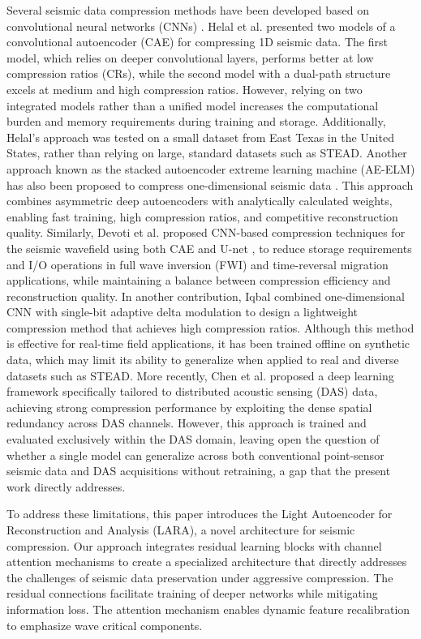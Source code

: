 \documentclass[fleqn,10pt]{wlscirep}
\begin{document}
Several seismic data compression methods have been developed based on convolutional neural networks (CNNs) \cite{lecun1989backpropagation,helal2021seismic,nuha2020deep,devoti2019wavefield,iqbal20221}. Helal et al. \cite{helal2021seismic} presented two models of a convolutional autoencoder (CAE) for compressing 1D seismic data. The first model, which relies on deeper convolutional layers, performs better at low compression ratios (CRs), while the second model with a dual-path structure excels at medium and high compression ratios. However, relying on two integrated models rather than a unified model increases the computational burden and memory requirements during training and storage. Additionally, Helal's approach was tested on a small dataset from East Texas in the United States, rather than relying on large, standard datasets such as STEAD. Another approach known as the stacked autoencoder extreme learning machine (AE-ELM) has also been proposed to compress one-dimensional seismic data \cite{nuha2020deep}. This approach combines asymmetric deep autoencoders with analytically calculated weights, enabling fast training, high compression ratios, and competitive reconstruction quality. Similarly, Devoti et al. \cite{devoti2019wavefield} proposed CNN-based compression techniques for the seismic wavefield using both CAE and U-net \cite{ronneberger2015u}, to reduce storage requirements and I/O operations in full wave inversion (FWI) and time-reversal migration applications, while maintaining a balance between compression efficiency and reconstruction quality. In another contribution, Iqbal \cite{iqbal20221} combined one-dimensional CNN with single-bit adaptive delta modulation to design a lightweight compression method that achieves high compression ratios. Although this method is effective for real-time field applications, it has been trained offline on synthetic data, which may limit its ability to generalize when applied to real and diverse datasets such as STEAD.  More recently, Chen et al. \cite{chen2025dascompression} proposed a deep learning framework specifically tailored to distributed acoustic sensing (DAS) data, achieving strong compression performance by exploiting the dense spatial redundancy across DAS channels. However, this approach is trained and evaluated exclusively within the DAS domain, leaving open the question of whether a single model can generalize across both conventional point-sensor seismic data and DAS acquisitions without retraining, a gap that the present work directly addresses.

To address these limitations, this paper introduces the Light Autoencoder for Reconstruction and Analysis (LARA), a novel architecture for seismic compression. Our approach integrates residual learning blocks with channel attention mechanisms to create a specialized architecture that directly addresses the challenges of seismic data preservation under aggressive compression. The residual connections facilitate training of deeper networks while mitigating information loss. The attention mechanism enables dynamic feature recalibration to emphasize wave critical components.
\end{document}
